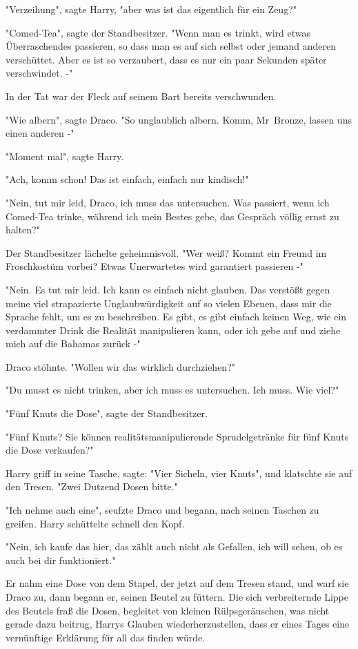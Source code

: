 {"Verzeihung", sagte Harry, "aber was ist das eigentlich für ein Zeug?"

"Comed-Tea", sagte der Standbesitzer. "Wenn man es trinkt, wird etwas Überraschendes passieren, so dass man es auf sich selbst oder jemand anderen verschüttet. Aber es ist so verzaubert, dass es nur ein paar Sekunden später verschwindet. -"

In der Tat war der Fleck auf seinem Bart bereits verschwunden.

"Wie albern", sagte Draco. "So unglaublich albern. Komm, Mr~Bronze, lassen uns einen anderen -"

"Moment mal", sagte Harry.

"Ach, komm schon! Das ist einfach, einfach nur kindisch!"

"Nein, tut mir leid, Draco, ich muss das untersuchen. Was passiert, wenn ich Comed-Tea trinke, während ich mein Bestes gebe, das Gespräch völlig ernst zu halten?"

Der Standbesitzer lächelte geheimnisvoll. "Wer weiß? Kommt ein Freund im Froschkostüm vorbei? Etwas Unerwartetes wird garantiert passieren -"

"Nein. Es tut mir leid. Ich kann es einfach nicht glauben. Das verstößt gegen meine viel strapazierte Unglaubwürdigkeit auf so vielen Ebenen, dass mir die Sprache fehlt, um es zu beschreiben. Es gibt, es gibt einfach keinen Weg, wie ein verdammter Drink die Realität manipulieren kann, oder ich gebe auf und ziehe mich auf die Bahamas zurück -"

Draco stöhnte. "Wollen wir das wirklich durchziehen?"

"Du musst es nicht trinken, aber ich muss es untersuchen. Ich muss. Wie viel?"

"Fünf Knuts die Dose", sagte der Standbesitzer.

"Fünf Knuts? Sie können realitätsmanipulierende Sprudelgetränke für fünf Knuts die Dose verkaufen?"

Harry griff in seine Tasche, sagte: "Vier Sicheln, vier Knuts", und klatschte sie auf den Tresen. "Zwei Dutzend Dosen bitte."

"Ich nehme auch eine", seufzte Draco und begann, nach seinen Taschen zu greifen. Harry schüttelte schnell den Kopf.

"Nein, ich kaufe das hier, das zählt auch nicht als Gefallen, ich will sehen, ob es auch bei dir funktioniert."

Er nahm eine Dose von dem Stapel, der jetzt auf dem Tresen stand, und warf sie Draco zu, dann begann er, seinen Beutel zu füttern. Die sich verbreiternde Lippe des Beutels fraß die Dosen, begleitet von kleinen Rülpsgeräuschen, was nicht gerade dazu beitrug, Harrys Glauben wiederherzustellen, dass er eines Tages eine vernünftige Erklärung für all das finden würde.

}
